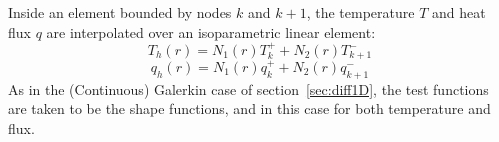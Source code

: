 Inside an element bounded by nodes $k$ and $k+1$, 
the temperature $T$ and heat flux $q$ are interpolated over an isoparametric linear element:
\[
T_h(r) = N_1(r) T_k^+ + N_2(r)T_{k+1}^-
\]
\[
q_h(r) = N_1(r) q_k^+ + N_2(r)q_{k+1}^-
\]
As in the (Continuous) Galerkin case of section~\ref{sec:diff1D}, the test functions are taken to 
be the shape functions, and in this case for both temperature and flux. 









